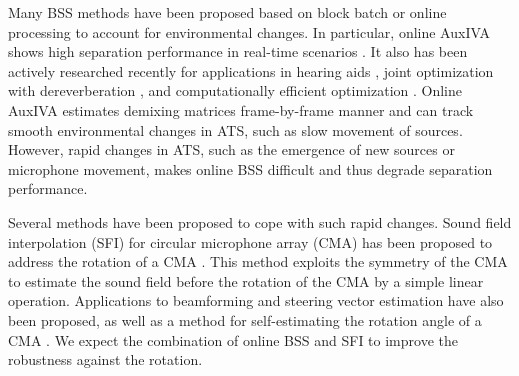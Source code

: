 \documentclass[sip,biber]{now-journal}
\begin{document}
Many BSS methods have been proposed based on block batch \cite{Koldovsky:2019:ICASSP,Koldovsky:2021:SP,Jansky:2022:ASMP} or online processing \cite{Kim:2010:CASI,Taniguchi:2014:HSCMA} to account for environmental changes.
In particular, online AuxIVA shows high separation performance in real-time scenarios \cite{Taniguchi:2014:HSCMA}.
It also has been actively researched recently for applications in hearing aids \cite{Sunohara:2017:ICASSP}, joint optimization with dereverberation \cite{Ueda:2021:ICASSP}, and computationally efficient optimization \cite{Nakashima:2023:ICASSP}.
Online AuxIVA estimates demixing matrices frame-by-frame manner and can track smooth environmental changes in ATS, such as slow movement of sources.
However, rapid changes in ATS, such as the emergence of new sources or microphone movement, makes online BSS difficult and thus degrade separation performance.

Several methods have been proposed to cope with such rapid changes.
Sound field interpolation (SFI) for circular microphone array (CMA) has been proposed to address the rotation of a CMA \cite{Wakabayashi:2023:ASLP}.
This method exploits the symmetry of the CMA to estimate the sound field before the rotation of the CMA by a simple linear operation.
Applications to beamforming \cite{Wakabayashi:2021:ICASSP} and steering vector estimation \cite{Wakabayashi:2021:ASJ:A} have also been proposed,
as well as a method for self-estimating the rotation angle of a CMA \cite{Lian:2021:APSIPA}.
We expect the combination of online BSS and SFI to improve the robustness against the rotation.
\end{document}
